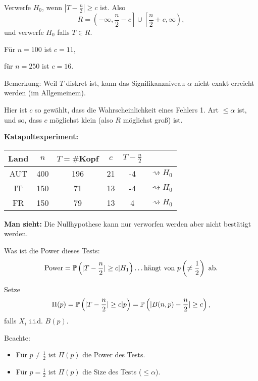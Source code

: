 \documentclass{tstextbook}
\begin{document}
\begin{example}
	Verwerfe $ H_0 $, wenn $ |T-\frac{n}{2}| \ge c $ ist. Also 
	\[
	R = \left(-\infty,\frac{n}{2}-c\right]\cup\left[\frac{n}{2}+c,\infty\right),
	\]
	und verwerfe $ H_0 $ falls $ T\in R $.
	
	Für $ n=100 $ ist $ c=11 $, 
	
	für $ n=250 $ ist $ c=16 $. 
	
	Bemerkung: Weil $ T $ diskret ist, kann das Signifikanzniveau $ \alpha $ nicht exakt erreicht werden (im Allgemeinem). 
	
	Hier ist $ c $ so gewählt, dass die Wahrscheinlichkeit eines Fehlers 1. Art $ \le\alpha $ ist, und so, dass $ c $ möglichst klein (also $ R $ möglichst groß) ist.
	
	\textbf{Katapultexperiment:}
		\vspace{0.5cm}

\begin{center}
	\begin{tabular}{c|c|c|c|c|c}
		Land 	& $ n $ 	& $ T=\# $Kopf 	& $ c $ 	& $ T-\frac{n}{2} $ 	& \\
		\midrule
		AUT		& 400		& 196 			& 21		& -4					& $ \rightsquigarrow H_0 $ \\
		IT		& 150		& 71 			& 13		& -4					& $ \rightsquigarrow H_0 $ \\
		FR		& 150		& 79 			& 13		& 4					& $ \rightsquigarrow H_0 $ \\
	\end{tabular}
\end{center}
	\vspace{0.5cm}
	
	\textbf{Man sieht:} Die Nullhypothese kann nur verworfen werden aber nicht bestätigt werden.
	
	Was ist die Power dieses Tests:
	\[
	\text{Power}=\mathbb P\left(|T-\frac{n}{2}|\ge c|H_1\right)\ldots \text{hängt von }p\left(\ne\frac{1}{2}\right) \text{ ab.}
	\]
	
	Setze
	\[
	\Pi(p)=\mathbb P\left(|T-\frac{n}{2}|\ge c|p\right) = \mathbb P\left(|B(n,p)-\frac{n}{2}|\ge c\right),
	\]
	falls $ X_i $ i.i.d. $ B(p) $.
	
	Beachte: 
	\begin{itemize}
		\item Für $ p\ne\frac{1}{2} $ ist $ \Pi(p) $ die Power des Tests.
		\item Für $ p=\frac{1}{2} $ ist $ \Pi(p) $ die Size des Tests ($ \le\alpha $).
	\end{itemize}
	
\end{example}
\end{document}
